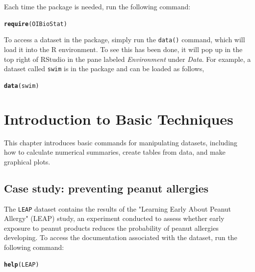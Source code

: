 \documentclass{report}\usepackage[]{graphicx}\usepackage[]{color}
\makeatletter
\newcommand{\hlstd}[1]{\textcolor[rgb]{0.345,0.345,0.345}{#1}}%
\newcommand{\hlkwd}[1]{\textcolor[rgb]{0.737,0.353,0.396}{\textbf{#1}}}%
\newenvironment{kframe}{%
 \def\at@end@of@kframe{}%
 \ifinner\ifhmode%
  \def\at@end@of@kframe{\end{minipage}}%
  \begin{minipage}{\columnwidth}%
 \fi\fi%
 \def\FrameCommand##1{\hskip\@totalleftmargin \hskip-\fboxsep
 \colorbox{shadecolor}{##1}\hskip-\fboxsep
     \hskip-\linewidth \hskip-\@totalleftmargin \hskip\columnwidth}%
 \MakeFramed {\advance\hsize-\width
   \@totalleftmargin\z@ \linewidth\hsize
   \@setminipage}}%
 {\par\unskip\endMakeFramed%
 \at@end@of@kframe}
\newenvironment{knitrout}{}{} %
\makeatother
\begin{document}
Each time the package is needed, run the following command: 
\begin{knitrout}
\color{fgcolor}\begin{kframe}
\begin{alltt}
\hlkwd{require}\hlstd{(OIBioStat)}
\end{alltt}
\end{kframe}
\end{knitrout}

To access a dataset in the package, simply run the \texttt{data()} command, which will load it into the \textsf{R} environment.  To see this has been done, it will pop up in the top right of \textsf{RStudio} in the pane labeled \textit{Environment} under \textit{Data}.  For example, a dataset called \texttt{swim} is in the package and can be loaded as follows, 
\begin{knitrout}
\color{fgcolor}\begin{kframe}
\begin{alltt}
\hlkwd{data}\hlstd{(swim)}
\end{alltt}
\end{kframe}
\end{knitrout}


\newpage 
\chapter{Introduction to Basic Techniques}
\minitoc

\vspace{0.5cm} 

This chapter introduces basic commands for manipulating datasets, including how to calculate numerical summaries, create tables from data, and make graphical plots. 

\section{Case study: preventing peanut allergies}

The \texttt{LEAP} dataset contains the results of the "Learning Early About Peanut Allergy" (LEAP) study, an experiment conducted to assess whether early exposure to peanut products reduces the probability of peanut allergies developing. To access the documentation associated with the dataset, run the following command: 

\begin{knitrout}
\color{fgcolor}\begin{kframe}
\begin{alltt}
\hlkwd{help}\hlstd{(LEAP)}
\end{alltt}
\end{kframe}
\end{knitrout}
\end{document}
